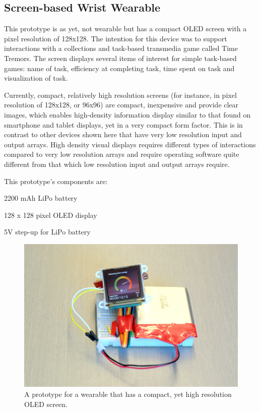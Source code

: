 \documentclass{chi-ext}
\begin{document}
\subsection{Screen-based Wrist Wearable}
This prototype is as yet, not wearable but has a compact OLED screen with a pixel  resolution of 128x128. The intention for this device was to support interactions with a collections and task-based transmedia game called Time Tremors. The screen displays several items of interest for simple task-based games: name of task, efficiency at completing task, time spent on task and visualization of task.

Currently, compact, relatively high resolution screens (for instance, in pixel resolution of 128x128, or 96x96) are compact, inexpensive and provide clear images, which enables high-density information display similar to that found on smartphone and tablet displays, yet in a very compact form factor. This is in contrast to other devices shown here that have very low resolution input and output arrays. High density visual displays requires different types of interactions compared to very low resolution arrays and require operating software quite different from that which low resolution input and output arrays require.

This prototype's components are:
\begin{inparaenum}
\item 2200 mAh LiPo battery
\item 128 x 128 pixel OLED display
\item 5V step-up for LiPo battery
\end{inparaenum}

\begin{figure}
  \begin{center}
  \includegraphics[width=\columnwidth]{images/P1130382.jpg}
  \caption{A prototype for a wearable that has a compact, yet high resolution OLED screen.}
  \label{fig:oledscreen}
  \end{center}  
\end{figure}
\end{document}
